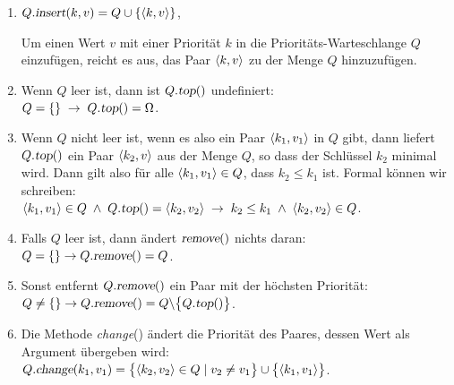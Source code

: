 \begin{Definition}
{\begin{enumerate}
\begin{enumerate}
             der Konstruktor erzeugt also eine leere
            Priorit\"ats-Warteschlange, die als leere Menge dargestellt wird. 
      \item $Q.\textsl{insert}(k, v) = Q \cup \{ \pair(k,v) \}$,
        
            Um einen Wert $v$ mit einer Priorit\"at $k$ in die Priorit\"ats-Warteschlange 
            $Q$ einzuf\"ugen, reicht es aus, das Paar $\pair(k,v)$ zu der Menge $Q$ hinzuzuf\"ugen.
      \item Wenn $Q$ leer ist, dann ist $Q.\textsl{top}()$ undefiniert: \\[0.1cm]
            \hspace*{1.3cm} $Q = \{\} \;\rightarrow\; Q.\textsl{top}() = \Omega$.
     \item Wenn $Q$ nicht leer ist, wenn es also ein Paar $\pair(k_1, v_1)$ in $Q$
              gibt, dann liefert $Q.\textsl{top}()$ ein Paar $\pair(k_2,v)$ aus der Menge
              $Q$, so dass der Schl\"ussel $k_2$ minimal wird.  Dann gilt also f\"ur
              alle $\pair(k_1,v_1) \in Q$, dass $k_2 \leq k_1$ ist.  Formal k\"onnen wir schreiben:
              \\[0.1cm]
              \hspace*{1.3cm} 
              $\pair(k_1,v_1) \in Q \;\wedge\; Q.\textsl{top}() = \pair(k_2,v_2)
              \;\rightarrow\; k_2 \leq k_1 \;\wedge\; \pair(k_2,v_2) \in Q$.
      \item Falls $Q$ leer ist, dann \"andert $\textsl{remove}()$ nichts daran: \\[0.1cm]
            \hspace*{1.3cm} $Q = \{\} \rightarrow Q.\textsl{remove}() = Q$.
      \item Sonst entfernt $Q.\textsl{remove}()$ ein Paar mit der h\"ochsten Priorit\"at: \\[0.1cm]
            \hspace*{1.3cm} 
            $Q \not= \{\} \rightarrow Q.\textsl{remove}() = Q \backslash \bigl\{ Q.\textsl{top}() \bigr\}$.
      \item Die Methode \textsl{change}() \"andert die Priorit\"at des Paares,
            dessen Wert als Argument \"ubergeben wird: \\[0.1cm]
            \hspace*{1.3cm} 
            $Q.\textsl{change}(k_1,v_1) = \bigl\{ \pair(k_2,v_2) \in Q \mid v_2 \not= v_1 \bigr\} \cup \bigl\{ \pair(k_1,v_1) \bigr\}$.
      \end{enumerate}
\end{enumerate}
}
\end{Definition}

